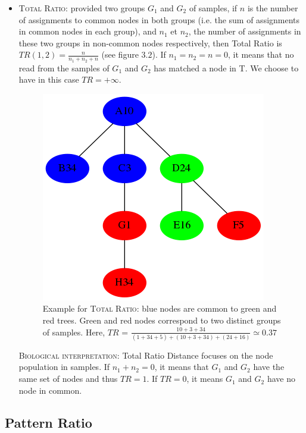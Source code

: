 \documentclass{report}
\begin{document}
\begin{itemize}
\item \textsc{Total Ratio:} provided two groups $G_{1}$ and $G_{2}$ of samples, if $n$ is the number of assignments to common nodes in both groups (i.e. the sum of assignments in common nodes in each group), and $n_{1}$ et $n_{2}$, the number of assignments in these two groups in non-common nodes respectively, then Total Ratio is $TR(1,2) = \frac{n}{n_{1} + n_{2} + n}$ (see figure $3.2$). If $n_{1} = n_{2} = n = 0$, it means that no read from the samples of $G_{1}$ and $G_{2}$ has matched a node in \textsc{T}. We choose to have in this case $TR = +\infty$.

\begin{figure}[H]
\centering
\includegraphics[scale=0.5]{illustrations/totalratio.png}
\caption{Example for \textsc{Total Ratio}: blue nodes are common to green and red trees. Green and red nodes correspond to two distinct groups of samples. Here, $TR$ = $\frac{10 + 3 + 34}{(1 + 34 + 5) + (10 + 3 + 34) + (24 + 16)} \simeq 0.37$}
\end{figure}

\bigskip

  \textsc{Biological interpretation:} Total Ratio Distance focuses on the node population in samples. If $n_{1} + n_{2} = 0$, it means that $G_{1}$ and $G_{2}$ have the same set of nodes and thus $TR = 1$. If $TR = 0$, it means $G_{1}$ and $G_{2}$ have no node in common.
\end{itemize}

\subsection{Pattern Ratio}
\end{document}
